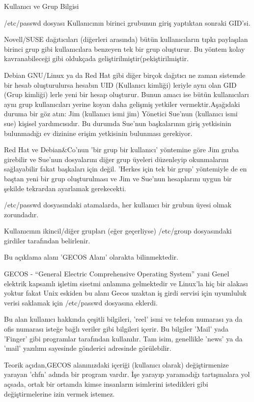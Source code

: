 \begin{section}{Kullanıcı ve Grup Bilgisi}
\begin{subsection}{/etc/passwd dosyası}
Kullanıcının birinci grubunun giriş yaptıktan sonraki GID'si.

Novell/SUSE dağıtıcıları (diğerleri arasında) bütün kullanıcıların tıpkı paylaşılan birinci grup gibi kullanıcılara benzeyen tek bir grup oluşturur. Bu yöntem kolay kavranabileceği gibi oldukçada geliştirilmiştir(pekiştirilmiştir.

Debian GNU/Linux ya da Red Hat gibi diğer birçok dağıtıcı ne zaman sistemde bir hesab oluşturulursa hesabın UID (Kullanıcı kimliği) leriyle aynı olan GID (Grup kimliği) lerle yeni bir hesap oluşturur. Bunun amacı ise bütün kullanıcıları aynı grup kullanıcıları yerine koyan daha gelişmiş yetkiler vermektir.Aşağıdaki duruma bir göz atın: Jim (kullanıcı ismi jim) Yönetici Sue'nun (kullanıcı ismi sue) kişisel yardımcısıdır. Bu durumda Sue'nun başkalarının giriş yetkisinin bulunmadığı ev dizinine erişim yetkisinin bulunması gerekiyor.

Red Hat ve Debian\&Co'nun 'bir grup bir kullanıcı' yöntemine göre Jim gruba girebilir ve Sue'nun dosyalarını diğer grup üyeleri düzenleyip okunmalarını sağlayabilir fakat başkaları için değil. 'Herkes için tek bir grup' yöntemiyle de en baştan yeni bir grup oluşturulması ve Jim ve Sue'nun hesaplarını uygun bir şekilde tekrardan ayarlamak gerekecekti.


/etc/passwd dosyasındaki atamalarda, her kullanıcı bir grubun üyesi olmak zorundadır.

Kullanıcının ikincil/diğer grupları (eğer geçerliyse) /etc/group dosyasındaki girdiler tarafından belirlenir.

Bu açıklama alanı 'GECOS Alanı' olarakta bilinmektedir.

GECOS - “General Electric Comprehensive Operating System” yani Genel elektrik kapsamlı işletim sisetmi anlamına gelmektedir ve Linux'la hiç bir alakası yoktur fakat Unix eskiden bu alanı Gecos uzaktan iş girdi servisi için uyumluluk verisi saklamak için /etc/passwd dosyasına eklerdi.

Bu alan kullanıcı hakkında çeşitli bilgileri, 'reel' ismi ve telefon numarası ya da ofis numarası isteğe bağlı veriler gibi bilgileri içerir. Bu bilgiler 'Mail' yada 'Finger' gibi programlar tarafından kullanılır. Tam isim, genellikle 'news' ya da 'mail' yazılımı sayesinde gönderici adresinde görülebilir.

Teorik açıdan,GECOS alanınızdaki içeriği (kullanıcı olarak) değiştirmenize yarayan 'chfn' adında bir program vardır. İşe yarayıp yaramadığı tartışmalara yol açsada, ortak bir ortamda kimse insanların isimlerini istedikleri gibi değiştirmelerine izin vermek istemez.


\end{subsection}
\end{section}
